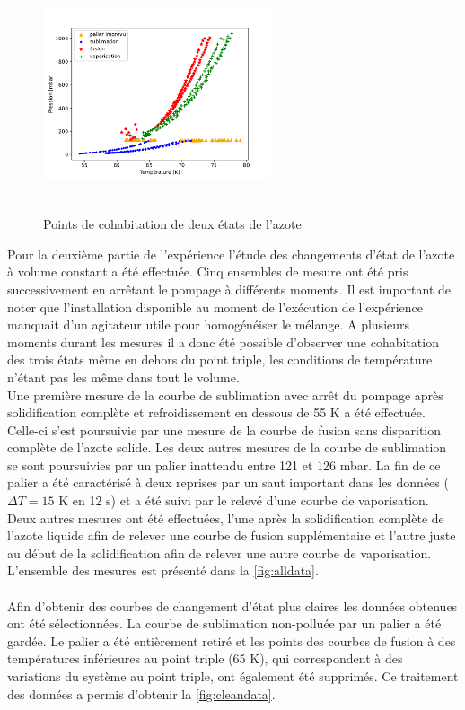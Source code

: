 \begin{figure}
    \centering
    \includegraphics[width=0.6\textwidth, height=7cm]{figures/etats_azote_all_data.pdf}
    \caption{Points de cohabitation de deux états de l'azote}
    \label{fig:alldata}
\end{figure}

Pour la deuxième partie de l'expérience l'étude des changements d'état de l'azote à volume constant a été effectuée. Cinq ensembles de mesure ont été pris successivement en arrêtant le pompage à différents moments. Il est important de noter que l'installation disponible au moment de l'exécution de l'expérience manquait d'un agitateur utile pour homogénéiser le mélange. A plusieurs moments durant les mesures il a donc été possible d'observer une cohabitation des trois états même en dehors du point triple, les conditions de température n'étant pas les même dans tout le volume. \\
Une première mesure de la courbe de sublimation avec arrêt du pompage après solidification complète et refroidissement en dessous de 55 \si{\kelvin} a été effectuée. Celle-ci s'est poursuivie par une mesure de la courbe de fusion sans disparition complète de l'azote solide. Les deux autres mesures de la courbe de sublimation se sont poursuivies par un palier inattendu entre 121 et 126 \si{\milli \bar}. La fin de ce palier a été caractérisé à deux reprises par un saut important dans les données (\(\Delta T = 15\) \si{\kelvin} en 12 \si{\second}) et a été suivi par le relevé d'une courbe de vaporisation. Deux autres mesures ont été effectuées, l'une après la solidification complète de l'azote liquide afin de relever une courbe de fusion supplémentaire et l'autre juste au début de la solidification afin de relever une autre courbe de vaporisation. L'ensemble des mesures est présenté dans la \autoref{fig:alldata}. \\
\\
Afin d'obtenir des courbes de changement d'état plus claires les données obtenues ont été sélectionnées. La courbe de sublimation non-polluée par un palier a été gardée. Le palier a été entièrement retiré et les points des courbes de fusion à des températures inférieures au point triple (65 \si{\kelvin}), qui correspondent à des variations du système au point triple, ont également été supprimés. Ce traitement des données a permis d'obtenir la \autoref{fig:cleandata}.


